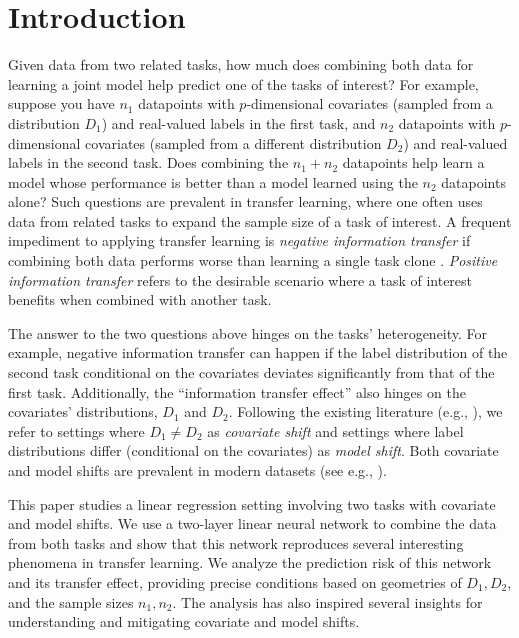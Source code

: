 \section{Introduction}\label{sec_introduction}

Given data from two related tasks, how much does combining both data for learning a joint model help predict one of the tasks of interest?
For example, suppose you have $n_1$ datapoints with $p$-dimensional covariates (sampled from a distribution $D_1$) and real-valued labels in the first task, and $n_2$ datapoints with $p$-dimensional covariates (sampled from a different distribution $D_2$) and real-valued labels in the second task. 
Does combining the $n_1 + n_2$ datapoints help learn a model whose performance is better than a model learned using the $n_2$ datapoints alone?
Such questions are prevalent in transfer learning, where one often uses data from related tasks to expand the sample size of a task of interest.
A frequent impediment to applying transfer learning is \textit{negative information transfer} if combining both data performs worse than learning a single task clone \cite{PY09}.
\textit{Positive information transfer} refers to the desirable scenario where a task of interest benefits when combined with another task.

The answer to the two questions above hinges on the tasks' heterogeneity.
For example, negative information transfer can happen if the label distribution of the second task conditional on the covariates deviates significantly from that of the first task.
Additionally, the ``information transfer effect'' also hinges on the covariates' distributions, $D_1$ and $D_2$.
Following the existing literature (e.g., \citet{kouw2018introduction}), we refer to settings where $D_1 \neq D_2$ as \textit{covariate shift} and settings where label distributions differ (conditional on the covariates) as \textit{model shift}.
Both covariate and model shifts are prevalent in modern datasets (see e.g., \citet{koh2021wilds}).

This paper studies a linear regression setting involving two tasks with covariate and model shifts.
We use a two-layer linear neural network to combine the data from both tasks and show that this network reproduces several interesting phenomena in transfer learning.
We analyze the prediction risk of this network and its transfer effect, providing precise conditions based on geometries of $D_1, D_2$, and the sample sizes $n_1, n_2$.
The analysis has also inspired several insights for understanding and mitigating covariate and model shifts.

